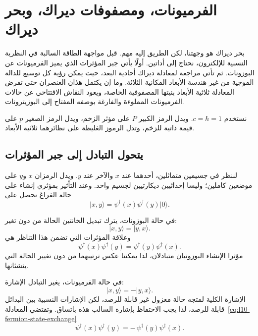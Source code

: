 \chapter{الفرميونات، ومصفوفات ديراك، وبحر ديراك}

بحر ديراك هو وجهتنا، لكن الطريق إليه مهم. قبل مواجهة الطاقة السالبة في النظرية النسبية للإلكترون، نحتاج إلى أداتين. أولًا يأتي جبر المؤثرات الذي يميز الفرميونات عن البوزونات. ثم تأتي مراجعة لمعادلة ديراك أحادية البعد، حيث يمكن رؤية كل توسيع للدالة الموجية من غير هندسة الأبعاد المكانية الثلاثة. وما إن يكتمل هذان العنصران حتى تفرض المعادلة ثلاثية الأبعاد بنيتها المصفوفية الخاصة، ويعود النقاش الافتتاحي عن حالات الفرميونات المملوءة والفارغة بوصفه المفتاح إلى البوزيترونات.

نستخدم \(c=\hbar=1\). ويدل الرمز الكبير \(P\) على مؤثر الزخم، ويدل الرمز الصغير \(p\) على قيمة ذاتية للزخم، وتدل الرموز الغليظة على نظائرهما ثلاثية الأبعاد.

\section{يتحول التبادل إلى جبر المؤثرات}

لننظر في جسيمين متماثلين، أحدهما عند \(x\) والآخر عند \(y\). ويدل الرمزان \(x\) و\(y\) على موضعين كاملين؛ وليسا إحداثيين ديكارتيين لجسيم واحد. وعند التأثير بمؤثري إنشاء على حالة الفراغ نحصل على
\begin{equation}
\lvert x,y\rangle
=
\psi^\dagger(x)\psi^\dagger(y)\lvert0\rangle.
\label{eq:l10-two-particle-state}
\end{equation}

في حالة البوزونات، يترك تبديل الخانتين الحالة من دون تغير:
\begin{equation}
\lvert x,y\rangle=\lvert y,x\rangle.
\end{equation}
وعلاقة المؤثرات التي تضمن هذا التناظر هي
\begin{equation}
\psi^\dagger(x)\psi^\dagger(y)
=
\psi^\dagger(y)\psi^\dagger(x).
\label{eq:l10-boson-exchange}
\end{equation}
مؤثرا الإنشاء البوزونيان متبادلان، لذا يمكننا عكس ترتيبهما من دون تغيير الحالة التي ينشئانها.

في حالة الفرميونات، يغير التبادل الإشارة:
\begin{equation}
\lvert x,y\rangle=-\lvert y,x\rangle.
\label{eq:l10-fermion-state-exchange}
\end{equation}
الإشارة الكلية لمتجه حالة معزول غير قابلة للرصد، لكن الإشارات النسبية بين البدائل قابلة للرصد، لذا يجب الاحتفاظ بإشارة السالب هذه باتساق. وتقتضي المعادلة~\eqref{eq:l10-fermion-state-exchange}
\begin{equation}
\psi^\dagger(x)\psi^\dagger(y)
=
-\,\psi^\dagger(y)\psi^\dagger(x).
\label{eq:l10-fermion-operator-exchange}
\end{equation}

